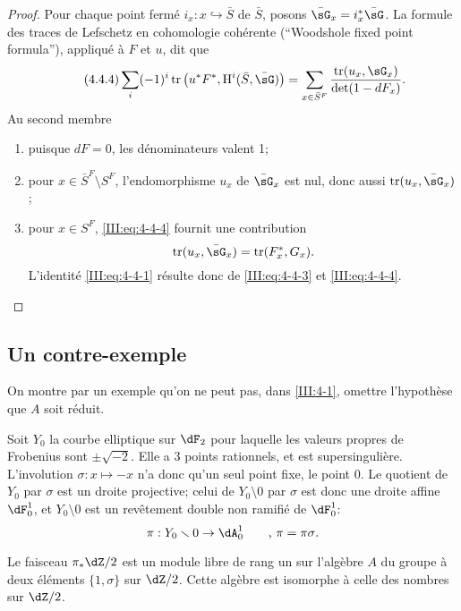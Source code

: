 \begin{proof}
Pour chaque point fermé $i_x:x\hookrightarrow \bar  S$ de $\bar S$, posons 
$\bar\sG_x = i_x^*\bar\sG$. La formule des traces de Lefschetz en cohomologie 
cohérente (``Woodshole fixed point formula''), appliqué à $F$ et $u$, dit 
que 
\begin{equation*}\tag{4.4.4}\label{III:eq:4-4-4}
  \sum_i (-1)^i \tr\left(u^* F^*, \h^i(\bar S,\bar\sG)\right) = \sum_{x\in \bar S^F} \frac{\tr(u_x,\sG_x)}{\det(1-d F_x)} \text{.}
\end{equation*}
Au second membre
\begin{enumerate}[\indent a)]
  \item puisque $d F=0$, les dénominateurs valent 1;
  \item pour $x\in \bar S^F\setminus S^F$, l'endomorphisme $u_x$ de $\bar\sG_x$ 
    est nul, donc aussi $\tr(u_x,\bar\sG_x)$;
  \item pour $x\in S^F$, \eqref{III:eq:4-4-4} fournit une contribution 
    \[
      \tr(u_x,\bar\sG_x) = \tr(F_x^*,G_x) \text{.}
    \]
    L'identité \eqref{III:eq:4-4-1} résulte donc de \eqref{III:eq:4-4-3} 
    et \eqref{III:eq:4-4-4}. 
\end{enumerate}
\end{proof}





\subsection{Un contre-exemple}\label{III:4-5}

On montre par un exemple qu'on ne peut pas, dans \ref{III:4-1}, omettre 
l'hypothèse que $A$ soit réduit.

Soit $Y_0$ la courbe elliptique sur $\dF_2$ pour laquelle les valeurs propres 
de Frobenius sont $\pm \sqrt{-2}$. Elle a $3$ points rationnels, et est 
supersingulière. L'involution $\sigma:x\mapsto -x$ n'a donc qu'un seul point 
fixe, le point $0$. Le quotient de $Y_0$ par $\sigma$ est un droite projective; 
celui de $Y_0\setminus 0$ par $\sigma$ est donc une droite affine $\dF_0^1$, et 
$Y_0\setminus 0$ est un revêtement double non ramifié de $\dF_0^1$:
\[
  \pi:Y_0\setminus 0 \to \dA_0^1 \qquad \text{, $\pi=\pi\sigma$.}
\]

Le faisceau $\pi_*\dZ/2$ est un module libre de rang un sur l'algèbre $A$ du 
groupe à deux éléments $\{1,\sigma\}$ sur $\dZ/2$. Cette algèbre est 
isomorphe à celle des nombres sur $\dZ/2$. 

